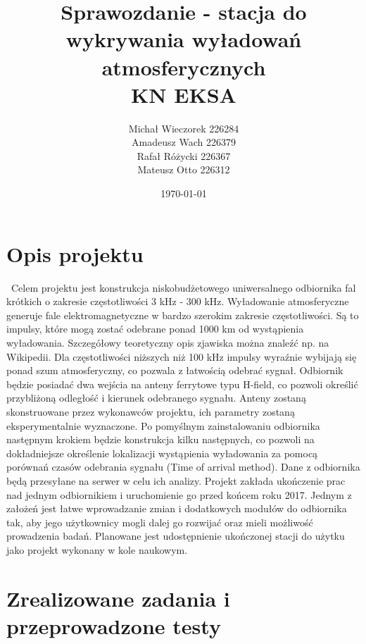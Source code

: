 \documentclass[12pt]{article}
\title{\textbf{Sprawozdanie - stacja do wykrywania wyładowań atmosferycznych}\\KN EKSA}
\author{Michał Wieczorek {226284}\\ Amadeusz Wach {226379}\\ Rafał Różycki {226367} \\ Mateusz Otto {226312}}
\date{\today}
\begin{document}
\maketitle
\newpage
\section{Opis projektu}
\ Celem projektu jest konstrukcja niskobudżetowego uniwersalnego odbiornika fal krótkich o zakresie częstotliwości 3 kHz - 300 kHz. Wyładowanie atmosferyczne generuje fale elektromagnetyczne w bardzo szerokim zakresie częstotliwości. Są to impulsy, które mogą zostać odebrane ponad 1000 km od wystąpienia wyładowania. Szczegółowy teoretyczny opis zjawiska można znaleźć np. na Wikipedii. Dla częstotliwości niższych niż 100 kHz impulsy wyraźnie wybijają się ponad szum atmosferyczny, co pozwala z łatwością odebrać sygnał. Odbiornik będzie posiadać dwa wejścia na anteny ferrytowe typu H-field, co pozwoli określić przybliżoną odległość i kierunek odebranego sygnału. Anteny zostaną skonstruowane przez wykonawców projektu, ich parametry zostaną eksperymentalnie wyznaczone. Po pomyślnym zainstalowaniu odbiornika następnym krokiem będzie konstrukcja kilku następnych, co pozwoli na dokładniejsze określenie lokalizacji wystąpienia wyładowania za pomocą porównań czasów odebrania sygnału (Time of arrival method). Dane z odbiornika będą przesyłane na serwer w celu ich analizy. Projekt zakłada ukończenie prac nad jednym odbiornikiem i uruchomienie go przed końcem roku 2017. Jednym z założeń jest łatwe wprowadzanie zmian i dodatkowych modułów do odbiornika tak, aby jego użytkownicy mogli dalej go rozwijać oraz mieli możliwość prowadzenia badań. Planowane jest udostępnienie ukończonej stacji do użytku jako projekt wykonany w kole naukowym.

\section{Zrealizowane zadania i przeprowadzone testy}
\end{document}
